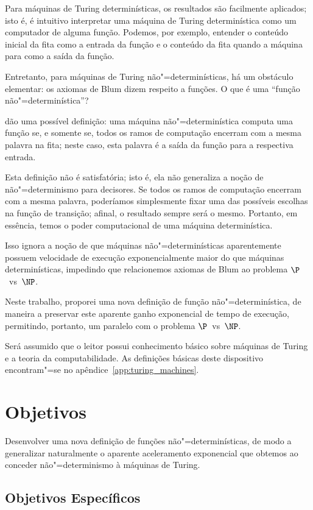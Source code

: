 Para máquinas de Turing determinísticas,
os resultados são facilmente aplicados;
isto é,
é intuitivo interpretar uma máquina de Turing determinística
como um computador de alguma função.
Podemos, por exemplo,
entender o conteúdo inicial da fita como a entrada da função
e o conteúdo da fita quando a máquina para como a saída da função.

Entretanto, para máquinas de Turing não"=determinísticas,
há um obstáculo elementar:
os axiomas de Blum dizem respeito a funções.
O que é uma ``função não"=determinística''?

 dão uma possível definição:
uma máquina não"=determinística computa uma função se,
e somente se,
todos os ramos de computação encerram com a mesma palavra na fita;
neste caso,
esta palavra é a saída da função para a respectiva entrada.

Esta definição não é satisfatória;
isto é, ela não generaliza a noção de não"=determinismo para decisores.
Se todos os ramos de computação encerram com a mesma palavra,
poderíamos simplesmente fixar uma das possíveis escolhas na função de transição;
afinal, o resultado sempre será o mesmo.
Portanto, em essência,
temos o poder computacional de uma máquina determinística.

Isso ignora a noção de que máquinas não"=determinísticas
aparentemente possuem velocidade de execução exponencialmente maior
do que máquinas determinísticas,
impedindo que relacionemos axiomas de Blum
ao problema $\P$~vs~$\NP$.

Neste trabalho,
proporei uma nova definição de função não"=determinística,
de maneira a preservar este aparente ganho exponencial de tempo de execução,
permitindo, portanto,
um paralelo com o problema $\P$~vs~$\NP$.

Será assumido que o leitor possui conhecimento básico
sobre máquinas de Turing e a teoria da computabilidade.
As definições básicas deste dispositivo
encontram"=se no apêndice~\ref{app:turing_machines}.

\section{Objetivos}

Desenvolver uma nova definição de funções não"=determinísticas,
de modo a generalizar naturalmente o aparente aceleramento exponencial
que obtemos ao conceder não"=determinismo à máquinas de Turing.

\subsection[Objetivos específicos]{Objetivos Específicos\footnotemark}

